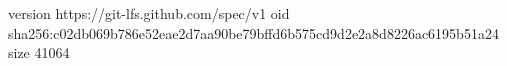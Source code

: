 version https://git-lfs.github.com/spec/v1
oid sha256:c02db069b786e52eae2d7aa90be79bffd6b575cd9d2e2a8d8226ac6195b51a24
size 41064
